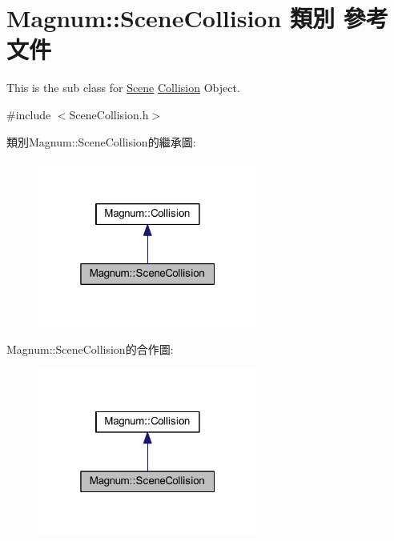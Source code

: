 \hypertarget{class_magnum_1_1_scene_collision}{}\section{Magnum\+:\+:Scene\+Collision 類別 參考文件}
\label{class_magnum_1_1_scene_collision}


This is the sub class for \hyperlink{class_magnum_1_1_scene}{Scene} \hyperlink{class_magnum_1_1_collision}{Collision} Object.  




{\ttfamily \#include $<$Scene\+Collision.\+h$>$}



類別\+Magnum\+:\+:Scene\+Collision的繼承圖\+:\nopagebreak
\begin{figure}[H]
\begin{center}
\leavevmode
\includegraphics[width=205pt]{class_magnum_1_1_scene_collision__inherit__graph}
\end{center}
\end{figure}


Magnum\+:\+:Scene\+Collision的合作圖\+:\nopagebreak
\begin{figure}[H]
\begin{center}
\leavevmode
\includegraphics[width=205pt]{class_magnum_1_1_scene_collision__coll__graph}
\end{center}
\end{figure}
